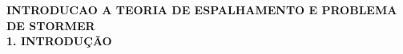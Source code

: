 \documentclass[
	11pt,				
	openright,			
	oneside,			
	a4paper,		
	english,			
	french,				
	spanish,			
	brazil				
	]{abntex2}
\begin{document}


\newpage

{
\fontsize{12pt}{\baselineskip}\selectfont
\textbf{INTRODUCAO A TEORIA DE ESPALHAMENTO E PROBLEMA DE STORMER}
}\\

\textbf{1. INTRODUÇÃO}

\lipsum
\end{document}
